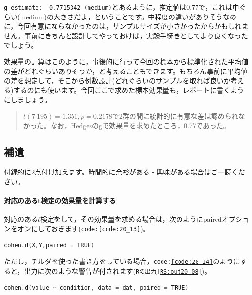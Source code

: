 \documentclass{ltjsbook}
\begin{document}
\texttt{g estimate: -0.7715342 (medium)}とあるように，推定値は0.77で，これは中ぐらい(medium)の大きさだよ，ということです。中程度の違いがありそうなのに，今回有意にならなかったのは，サンプルサイズが小さかったからかもしれません。事前にきちんと設計してやっておけば，実験手続きとしてより良くなったでしょう。

効果量の計算はこのように，事後的に行って今回の標本から標準化された平均値の差がどれぐらいありそうか，と考えることもできます。もちろん事前に平均値の差を想定して，そこから例数設計(どれぐらいのサンプルを取れば良いか考える)するのにも使います。今回ここで求めた標本効果量も，レポートに書くようにしましょう。

\begin{quote}
	$t(7.195)=1.351,p = 0.2178$で2群の間に統計的に有意な差は認められなかった。なお，Hedgesのgで効果量を求めたところ，0.77であった。
\end{quote}

\subsection{補遺}
付録的に2点付け加えます。時間的に余裕がある・興味がある場合はご一読ください。
\paragraph{対応のあるt検定の効果量を計算する}対応のある$t$検定をして，その効果量を求める場合は，次のようにpairedオプションをオンにしておきます(\texttt{code:\ref{code:20_13}})。

\begin{lstlisting}[language=c++,label={code:20_13},caption={cohenのd}]
cohen.d(X,Y,paired = TRUE)
\end{lstlisting}
ただし，チルダを使った書き方をしている場合，\texttt{code:\ref{code:20_14}}のようにすると，出力に次のような警告が付されます(\texttt{Rの出力\ref{RS:out20_08}})。
\begin{lstlisting}[language=c++,label={code:20_14},caption={cohenのdその2}]
cohen.d(value ~ condition, data = dat, paired = TRUE)
\end{lstlisting}
\end{document}

